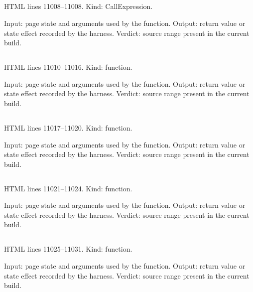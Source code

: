 \subsection*{\texttt{}}
\label{vf_597_MISSY_COLORS}
HTML lines 11008--11008. Kind: CallExpression.

Input: page state and arguments used by the function.
Output: return value or state effect recorded by the harness.
Verdict: source range present in the current build.

\subsection*{\texttt{}}
\label{vf_598_missyEmblem}
HTML lines 11010--11016. Kind: function.

Input: page state and arguments used by the function.
Output: return value or state effect recorded by the harness.
Verdict: source range present in the current build.

\subsection*{\texttt{}}
\label{vf_599_missyWords}
HTML lines 11017--11020. Kind: function.

Input: page state and arguments used by the function.
Output: return value or state effect recorded by the harness.
Verdict: source range present in the current build.

\subsection*{\texttt{}}
\label{vf_600_missySvg}
HTML lines 11021--11024. Kind: function.

Input: page state and arguments used by the function.
Output: return value or state effect recorded by the harness.
Verdict: source range present in the current build.

\subsection*{\texttt{}}
\label{vf_601_missyMarkWithSvg}
HTML lines 11025--11031. Kind: function.

Input: page state and arguments used by the function.
Output: return value or state effect recorded by the harness.
Verdict: source range present in the current build.

